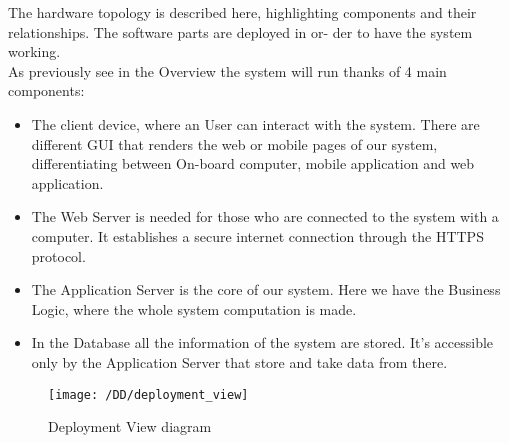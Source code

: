 The hardware topology is described here, highlighting components and their relationships. The software parts are deployed in or-
der to have the system working.
\\As previously see in the Overview the system will run thanks of 4 main components:
\begin{itemize}
	\item{The client device, where an User can interact with the system. There are different GUI that renders the web or mobile pages of our system, differentiating between On-board computer, mobile application and web application.}
	\item{ The Web Server is needed for those who are connected to the system with a computer. It establishes a secure internet connection through the HTTPS protocol.}
	\item{The Application Server is the core of our system. Here we have the Business Logic, where the whole system computation is
made.}
	\item{In the Database all the information of the system are stored. It's accessible only by the Application Server that store and take data from there.}
\end{itemize} 

\begin{figure}[!ht]
  \centering
  \vspace{0.2cm}
  \texttt{[image: /DD/deployment\_view]}\\
  \vspace{0.4cm}
  \caption{Deployment View diagram} 
  \label{fig:DeploymentView} 
\end{figure}
